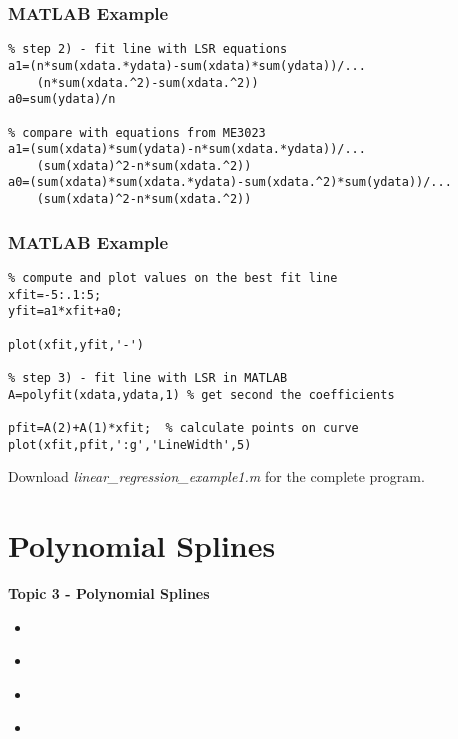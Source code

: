 \documentclass[fleqn]{beamer} %
\newcommand{\sectionIIItitle}{Polynomial Splines}
\newcommand{\sectionIIsubsectionIVtitle}{MATLAB Example}
\newcommand{\sectionIIIsubsectionItitle}{}
\newcommand{\sectionIIIsubsectionIItitle}{}
\newcommand{\sectionIIIsubsectionIIItitle}{}
\newcommand{\sectionIIIsubsectionIVtitle}{}
\begin{document}
			\begin{frame}[fragile]
				\frametitle{\sectionIIsubsectionIVtitle}
				\bigskip

        \begin{lstlisting}
% step 2) - fit line with LSR equations
a1=(n*sum(xdata.*ydata)-sum(xdata)*sum(ydata))/...
    (n*sum(xdata.^2)-sum(xdata.^2))
a0=sum(ydata)/n

% compare with equations from ME3023
a1=(sum(xdata)*sum(ydata)-n*sum(xdata.*ydata))/...
    (sum(xdata)^2-n*sum(xdata.^2))
a0=(sum(xdata)*sum(xdata.*ydata)-sum(xdata.^2)*sum(ydata))/...
    (sum(xdata)^2-n*sum(xdata.^2))          
        \end{lstlisting}

				\btVFill 
			\end{frame}

			\begin{frame}[fragile]
				\frametitle{\sectionIIsubsectionIVtitle}
				\bigskip

        \begin{lstlisting}
% compute and plot values on the best fit line
xfit=-5:.1:5;
yfit=a1*xfit+a0;

plot(xfit,yfit,'-')

% step 3) - fit line with LSR in MATLAB
A=polyfit(xdata,ydata,1) % get second the coefficients

pfit=A(2)+A(1)*xfit;  % calculate points on curve
plot(xfit,pfit,':g','LineWidth',5)
        \end{lstlisting}

        Download {\it linear\_regression\_example1.m} for the complete program.
				\btVFill 
			\end{frame}

	\section{\sectionIIItitle}\label{sectionIII}

		\begin{frame}
			\large \textbf{Topic 3 - \sectionIIItitle} \vspace{3mm}\\

			\begin{itemize}
				\item \hyperlink{sectionIIIsubsectionI}{\sectionIIIsubsectionItitle} \vspc %
				\item \hyperlink{sectionIIIsubsectionII}{\sectionIIIsubsectionIItitle} \vspc %
				\item \hyperlink{sectionIIIsubsectionIII}{\sectionIIIsubsectionIIItitle} \vspc %
				\item \hyperlink{sectionIIIsubsectionIV}{\sectionIIIsubsectionIVtitle} \vspc %
			\end{itemize}

		\end{frame}
\end{document}
